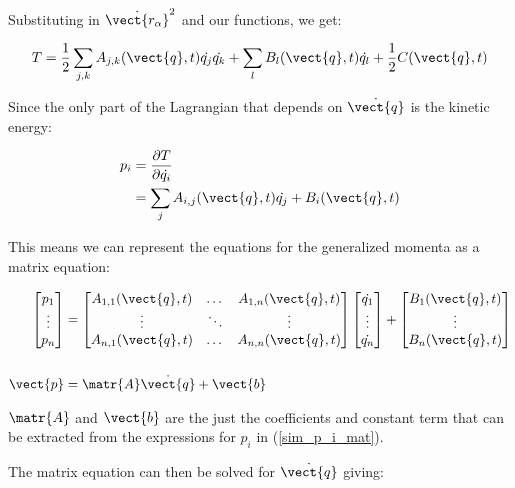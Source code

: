 Substituting in ${\Dot{\vect{r_\alpha}}}^2$ and our functions, we get:

\[
    T = \frac{1}{2} \sum_{j,k} A_{j,k}(\vect{q}, t) \Dot{q_j} \Dot{q_k} + \sum_l B_l(\vect{q}, t) \Dot{q_l} + \frac{1}{2} C(\vect{q}, t)
\]

Since the only part of the Lagrangian that depends on $\Dot{\vect{q}}$ is the kinetic energy:

\begin{align}
    p_i &= \frac{\partial T}{\partial \dot{q_i}} \nonumber\\
        &= \sum_j A_{i, j}(\vect{q}, t) \Dot{q_j} + B_i(\vect{q}, t) \label{sim_p_i_mat}
\end{align}

This means we can represent the equations for the generalized momenta as a matrix equation:

\begin{align*}
    \begin{bmatrix}
        p_1 \\
        \vdots \\
        p_n
    \end{bmatrix}
    &=
    \begin{bmatrix}
        A_{1,1}(\vect{q}, t) & \dots & A_{1,n}(\vect{q}, t) \\
        \vdots & \ddots & \vdots \\
        A_{n,1}(\vect{q}, t) & \dots & A_{n,n}(\vect{q}, t)
    \end{bmatrix}
    \begin{bmatrix}
        \Dot{q_1} \\
        \vdots \\
        \Dot{q_n}
    \end{bmatrix}
    +
    \begin{bmatrix}
        B_1(\vect{q}, t) \\
        \vdots \\
        B_n(\vect{q}, t)
    \end{bmatrix}\\\\
    \vect{p} &= \matr{A} \Dot{\vect{q}} + \vect{b}
\end{align*}

$\matr{A}$ and $\vect{b}$ are the just the coefficients and constant term that can be extracted from the expressions for $p_i$ in (\ref{sim_p_i_mat}).

The matrix equation can then be solved for $\Dot{\vect{q}}$ giving:

